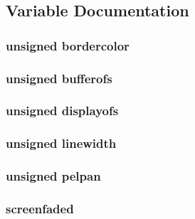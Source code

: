 \subsection{Variable Documentation}
\hypertarget{ID__VL_8H_a7d243f7a427ebc7df3533c0cd5760971}{
\subsubsection[{bordercolor}]{\setlength{\rightskip}{0pt plus 5cm}unsigned {\bf bordercolor}}}
\label{ID__VL_8H_a7d243f7a427ebc7df3533c0cd5760971}
\hypertarget{ID__VL_8H_a95b7c90690730f0b09409f1fb8ef3730}{
\subsubsection[{bufferofs}]{\setlength{\rightskip}{0pt plus 5cm}unsigned {\bf bufferofs}}}
\label{ID__VL_8H_a95b7c90690730f0b09409f1fb8ef3730}
\hypertarget{ID__VL_8H_ae69449df2121a068cc86de491d7b5956}{
\subsubsection[{displayofs}]{\setlength{\rightskip}{0pt plus 5cm}unsigned {\bf displayofs}}}
\label{ID__VL_8H_ae69449df2121a068cc86de491d7b5956}
\hypertarget{ID__VL_8H_a4290871866270ef6854fb238a3c8698d}{
\subsubsection[{linewidth}]{\setlength{\rightskip}{0pt plus 5cm}unsigned {\bf linewidth}}}
\label{ID__VL_8H_a4290871866270ef6854fb238a3c8698d}
\hypertarget{ID__VL_8H_a868e53c86d5ef1ddae46b80290a36cd8}{
\subsubsection[{pelpan}]{\setlength{\rightskip}{0pt plus 5cm}unsigned {\bf pelpan}}}
\label{ID__VL_8H_a868e53c86d5ef1ddae46b80290a36cd8}
\hypertarget{ID__VL_8H_a81e1545cb2fb150263b44e54eee49451}{
\subsubsection[{screenfaded}]{ {\bf screenfaded}}}
